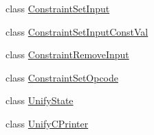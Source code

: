 \begin{DoxyCompactItemize}
\item 
class \mbox{\hyperlink{class_constraint_set_input}{Constraint\+Set\+Input}}
\item 
class \mbox{\hyperlink{class_constraint_set_input_const_val}{Constraint\+Set\+Input\+Const\+Val}}
\item 
class \mbox{\hyperlink{class_constraint_remove_input}{Constraint\+Remove\+Input}}
\item 
class \mbox{\hyperlink{class_constraint_set_opcode}{Constraint\+Set\+Opcode}}
\item 
class \mbox{\hyperlink{class_unify_state}{Unify\+State}}
\item 
class \mbox{\hyperlink{class_unify_c_printer}{Unify\+C\+Printer}}
\end{DoxyCompactItemize}
